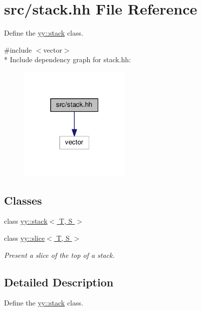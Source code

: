 \hypertarget{src_2stack_8hh}{}\section{src/stack.hh File Reference}
\label{src_2stack_8hh}


Define the \hyperlink{classyy_1_1stack}{yy\+::stack} class.  


{\ttfamily \#include $<$vector$>$}\\*
Include dependency graph for stack.\+hh\+:\nopagebreak
\begin{figure}[H]
\begin{center}
\leavevmode
\includegraphics[width=151pt]{src_2stack_8hh__incl}
\end{center}
\end{figure}
\subsection*{Classes}
\begin{DoxyCompactItemize}
\item 
class \hyperlink{classyy_1_1stack}{yy\+::stack$<$ T, S $>$}
\item 
class \hyperlink{classyy_1_1slice}{yy\+::slice$<$ T, S $>$}
\begin{DoxyCompactList}\small\item\em Present a slice of the top of a stack. \end{DoxyCompactList}\end{DoxyCompactItemize}


\subsection{Detailed Description}
Define the \hyperlink{classyy_1_1stack}{yy\+::stack} class. 

